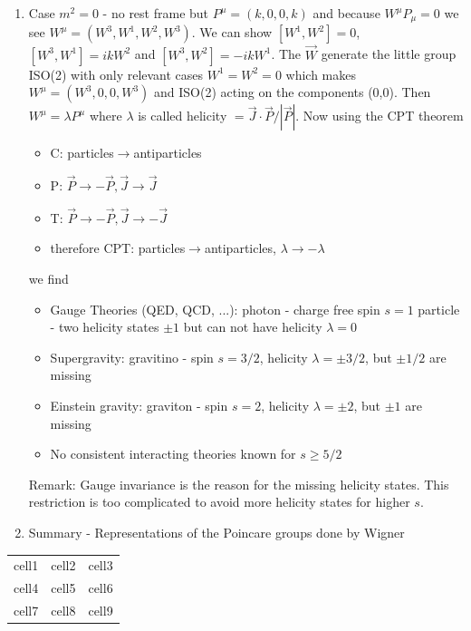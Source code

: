 \documentclass[10pt,a4paper]{book}
\theoremstyle{definition}
\begin{document}
\begin{itemize}
\begin{enumerate}
\item Case $m^2=0$ - no rest frame but $P^\mu=(k,0,0,k)$ and because $W^\mu P_\mu=0$ we see $W^\mu=(W^3,W^1,W^2,W^3)$. We can show $[W^1,W^2]=0$, $[W^3,W^1]=ikW^2$ and $[W^3,W^2]=-ikW^1$. The $\vec{W}$ generate the little group ISO(2) with only relevant cases $W^1=W^2=0$ which makes $W^\mu=(W^3,0,0,W^3)$ and ISO(2) acting on the components (0,0). Then $W^\mu=\lambda P^\mu$ where $\lambda$ is called helicity $=\vec{J}\cdot\vec{P}/|\vec{P}|$. 
Now using the CPT theorem
\begin{itemize}
\item C: particles$\rightarrow$antiparticles
\item P: $\vec{P}\rightarrow-\vec{P},\vec{J}\rightarrow\vec{J}$
\item T: $\vec{P}\rightarrow-\vec{P},\vec{J}\rightarrow-\vec{J}$
\item therefore CPT: particles$\rightarrow$antiparticles, $\lambda\rightarrow-\lambda$
\end{itemize}
we find 
\begin{itemize}
\item Gauge Theories (QED, QCD, ...): photon - charge free spin $s=1$  particle - two helicity states $\pm1$ but can not have helicity $\lambda=0$
\item Supergravity: gravitino - spin $s=3/2$, helicity $\lambda=\pm3/2$, but $\pm1/2$ are missing
\item Einstein gravity: graviton - spin $s=2$, helicity $\lambda=\pm2$, but $\pm1$ are missing
\item No consistent interacting theories known for $s\ge5/2$
\end{itemize}
Remark: Gauge invariance is the reason for the missing helicity states. This restriction is too complicated to avoid more helicity states for higher $s$.
\item Summary - Representations of the Poincare groups done by Wigner
\end{enumerate}
\end{itemize}



\begin{center}
\begin{tabular}{ c c c }
 cell1 & cell2 & cell3 \\ 
 cell4 & cell5 & cell6 \\  
 cell7 & cell8 & cell9    
\end{tabular}
\end{center}
\end{document}
